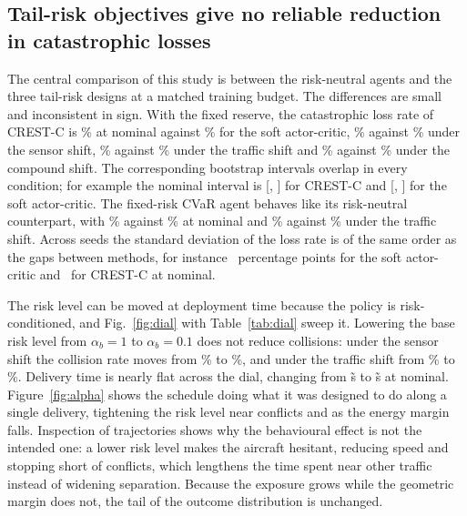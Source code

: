 \subsection*{Tail-risk objectives give no reliable reduction in catastrophic losses}

The central comparison of this study is between the risk-neutral agents and the three tail-risk designs at a matched training budget. The differences are small and inconsistent in sign. With the fixed reserve, the catastrophic loss rate of CREST-C is \RCrestcStdLossNominal\% at nominal against \RSacStdLossNominal\% for the soft actor-critic, \RCrestcStdLossSensor\% against \RSacStdLossSensor\% under the sensor shift, \RCrestcStdLossTraffic\% against \RSacStdLossTraffic\% under the traffic shift and \RCrestcStdLossCompound\% against \RSacStdLossCompound\% under the compound shift. The corresponding bootstrap intervals overlap in every condition; for example the nominal interval is [\CCrestcStdLossNominalLo, \CCrestcStdLossNominalHi] for CREST-C and [\CSacStdLossNominalLo, \CSacStdLossNominalHi] for the soft actor-critic. The fixed-risk CVaR agent behaves like its risk-neutral counterpart, with \RDsaccvarStdLossNominal\% against \RDsacnStdLossNominal\% at nominal and \RDsaccvarStdLossTraffic\% against \RDsacnStdLossTraffic\% under the traffic shift. Across seeds the standard deviation of the loss rate is of the same order as the gaps between methods, for instance \SSacStdLossNominal\ percentage points for the soft actor-critic and \SCrestcStdLossNominal\ for CREST-C at nominal.

The risk level can be moved at deployment time because the policy is risk-conditioned, and Fig.~\ref{fig:dial} with Table~\ref{tab:dial} sweep it. Lowering the base risk level from \(\alpha_b=1\) to \(\alpha_b=0.1\) does not reduce collisions: under the sensor shift the collision rate moves from \DOnepZeroCollSensor\% to \DZeropOneCollSensor\%, and under the traffic shift from \DOnepZeroCollTraffic\% to \DZeropOneCollTraffic\%. Delivery time is nearly flat across the dial, changing from \DOnepZeroTdelNominal\~s to \DZeropOneTdelNominal\~s at nominal. Figure~\ref{fig:alpha} shows the schedule doing what it was designed to do along a single delivery, tightening the risk level near conflicts and as the energy margin falls. Inspection of trajectories shows why the behavioural effect is not the intended one: a lower risk level makes the aircraft hesitant, reducing speed and stopping short of conflicts, which lengthens the time spent near other traffic instead of widening separation. Because the exposure grows while the geometric margin does not, the tail of the outcome distribution is unchanged.

